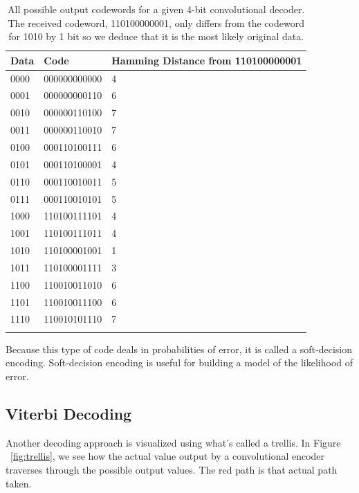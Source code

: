 \documentclass[12pt]{article}
\begin{document}
\begin{longtable}{| p{} | p{} | p{} |} 
\hline
\textbf{Data} & \textbf{Code}    &     \textbf{Hamming Distance from 110100000001}  \\ \hline
0000 & 000000000000 & 4                \\ \hline
0001 & 000000000110 & 6                \\ \hline
0010 & 000000110100 & 7                \\ \hline
0011 & 000000110010 & 7                \\ \hline
0100 & 000110100111 & 6                \\ \hline
0101 & 000110100001 & 4                \\ \hline
0110 & 000110010011 & 5                \\ \hline
0111 & 000110010101 & 5                \\ \hline
1000 & 110100111101 & 4                \\ \hline
1001 & 110100111011 & 4                \\ \hline
1010 & 110100001001 & 1                \\ \hline
1011 & 110100001111 & 3                \\ \hline
1100 & 110010011010 & 6                \\ \hline
1101 & 110010011100 & 6                \\ \hline
1110 & 110010101110 & 7                \\ \hline
\caption{All possible output codewords for a given 4-bit convolutional decoder. The received codeword, 110100000001, only differs from the codeword for 1010 by 1 bit so we deduce that it is the most likely original data.}
\label{tab:tab}
\end{longtable}

Because this type of code deals in probabilities of error, it is called a soft-decision encoding. Soft-decision encoding is useful for building a model of the likelihood of error. \cite{tanenbaum}

\subsection{Viterbi Decoding}

Another decoding approach is visualized using what's called a trellis. In Figure ~\ref{fig:trellis}, we see how the actual value output by a convolutional encoder traverses through the possible output values. The red path is that actual path taken.
\end{document}
